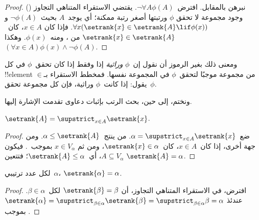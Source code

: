 \documentclass[../../../include/open-logic-section]{subfiles}
\begin{document}
\begin{proof}
نبرهن بالمقابل. افترض~$\lnot \forall A \phi(A)$. يقتضي الاستقراء
المتناهي التجاوز
() وجود مجموعة لا تحقق
$\phi$ ورتبتها أصغر رتبة ممكنة؛ أي يوجد~$A$ بحيث~$\lnot \phi(A)$ و
$\forall x(\setrank{x} \in \setrank{A} \lif \phi(x))$. فإذا كان
$x \in A$، كان~$\setrank{x} \in \setrank{A}$ من
، ومنه~$\phi(x)$. وهكذا
$(\forall x \in A)\phi(x) \land \lnot \phi(A)$.
\end{proof}\noindent
ومعنى ذلك بغير الرموز أن نقول إن~$\phi$ \emph{وراثية} إذا وفقط إذا
كان تحقق~$\phi$ في كل !!{element} من مجموعة موجبًا لتحقق~$\phi$ في
المجموعة نفسها. فمخطط الاستقراء بـ$\in$ يقول: إذا كانت~$\phi$ وراثية،
فإن كل مجموعة تحقق~$\phi$.

ونختم، إلى حين، بحث الرتب بإثبات دعاوى تقدمت الإشارة إليها.

\begin{prop}
$\setrank{A} = \supstrict_{x \in A}\setrank{x}$.
\end{prop}

\begin{proof}
ضع~$\alpha = \supstrict_{x \in A}\setrank{x}$. من
 ينتج~$\alpha \leq \setrank{A}$. ومن جهة
أخرى، إذا كان~$x \in A$، كان~$\setrank{x} \in \alpha$، ومن ثم
$x \in V_\alpha$ بموجب~. فيكون
$A \subseteq V_\alpha$، أي~$\setrank{A} \leq \alpha$؛ فتتعين
$\setrank{A} = \alpha$.
\end{proof}

\begin{cor}
لكل عدد ترتيبي~$\alpha$، $\setrank{\alpha} = \alpha$.
\end{cor}

\begin{proof}
افترض، في الاستقراء المتناهي التجاوز، أن
$\setrank{\beta} = \beta$ لكل~$\beta \in \alpha$. عندئذ
$\setrank{\alpha} = \supstrict_{\beta \in \alpha}\setrank{\beta}
= \supstrict_{\beta \in \alpha}\beta = \alpha$ بموجب
.
%
\end{proof}
\end{document}
